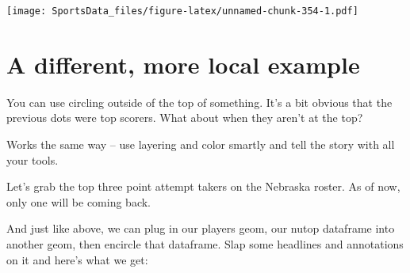 \documentclass[
]{book}
\newenvironment{Shaded}{\begin{snugshade}}{\end{snugshade}}
\newcommand{\DataTypeTok}[1]{\textcolor[rgb]{0.13,0.29,0.53}{#1}}
\newcommand{\DecValTok}[1]{\textcolor[rgb]{0.00,0.00,0.81}{#1}}
\newcommand{\KeywordTok}[1]{\textcolor[rgb]{0.13,0.29,0.53}{\textbf{#1}}}
\newcommand{\NormalTok}[1]{#1}
\newcommand{\OperatorTok}[1]{\textcolor[rgb]{0.81,0.36,0.00}{\textbf{#1}}}
\newcommand{\StringTok}[1]{\textcolor[rgb]{0.31,0.60,0.02}{#1}}
\begin{document}
\texttt{[image: SportsData\_files/figure-latex/unnamed-chunk-354-1.pdf]}

\hypertarget{a-different-more-local-example}{%
\section{A different, more local example}\label{a-different-more-local-example}}

You can use circling outside of the top of something. It's a bit obvious that the previous dots were top scorers. What about when they aren't at the top?

Works the same way -- use layering and color smartly and tell the story with all your tools.

Let's grab the top three point attempt takers on the Nebraska roster. As of now, only one will be coming back.

\begin{Shaded}
\end{Shaded}

And just like above, we can plug in our players geom, our nutop dataframe into another geom, then encircle that dataframe. Slap some headlines and annotations on it and here's what we get:
\end{document}
